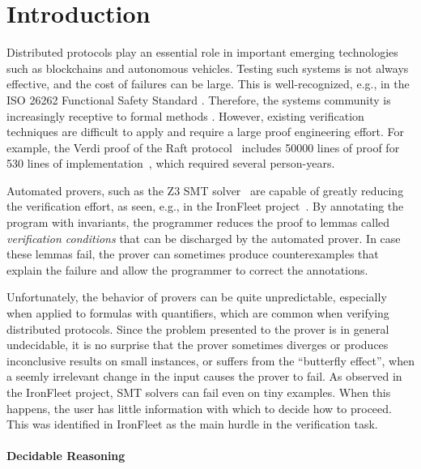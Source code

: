 \section{Introduction}


Distributed protocols play an essential role in important emerging technologies such as blockchains and autonomous vehicles.
Testing such systems is not always effective, and the cost of failures can be large.
This is well-recognized, e.g., in the ISO 26262 Functional Safety Standard \cite{ISO26262}.
Therefore, the systems community is increasingly receptive to formal methods \cite{Verdi,IronFleet,DBLP:conf/sosp/ChenZCCKZ15,DBLP:conf/sosp/NelsonSZJBTW17,DBLP:conf/sosp/ChenCKWICKZ17,DBLP:conf/sosp/FerraiuoloBHP17}.
However, existing verification techniques are difficult to apply
and require a large proof engineering effort. For example, the Verdi proof of the Raft protocol~\cite{raft} includes 50000 lines of proof for 530 lines of
implementation~\cite{VerdiCPP}, which required several person-years.

Automated provers, such as the Z3 SMT solver~\cite{Z3} are capable of
greatly reducing the verification effort, as seen, e.g., in the
IronFleet project~\cite{IronFleet}.  By annotating the program with
invariants, the programmer reduces the proof to lemmas called
\emph{verification conditions} that can be discharged by the automated
prover.  In case these lemmas fail, the prover can sometimes produce
counterexamples that explain the failure and allow the
programmer to correct the annotations.

Unfortunately, the behavior of provers can be quite unpredictable,
especially when applied to formulas with quantifiers, which are common
when verifying distributed protocols. Since the problem presented to
the prover is in general undecidable, it is no surprise that the
prover sometimes diverges or produces inconclusive results on small
instances, or suffers from the ``butterfly effect'', when a seemly
irrelevant change in the input causes the prover to fail. As observed
in the IronFleet project, SMT solvers can fail even on tiny
examples. When this happens, the user has little information with
which to decide how to proceed.  This was identified in IronFleet as
the main hurdle in the verification task.

\paragraph{Decidable Reasoning} %

